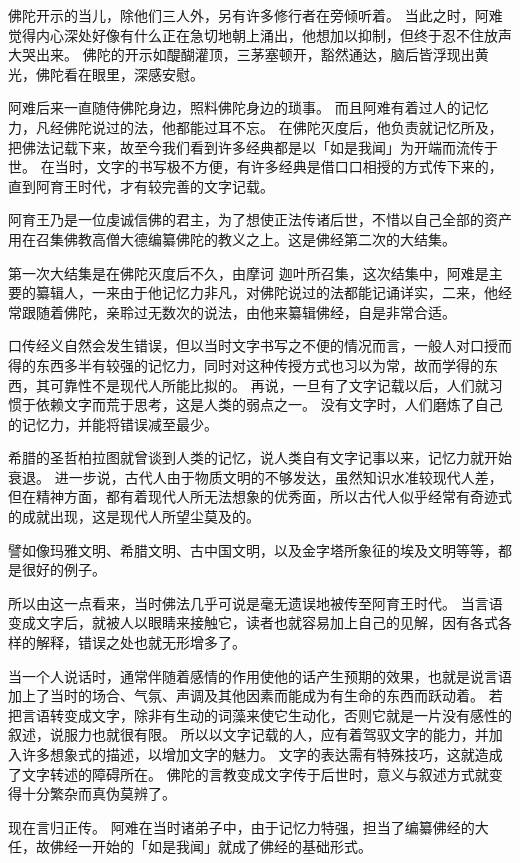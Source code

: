 \documentclass[twoside,openany]{book}
\begin{document}
佛陀开示的当儿，除他们三人外，另有许多修行者在旁倾听着。
当此之时，阿难觉得内心深处好像有什么正在急切地朝上涌出，他想加以抑制，但终于忍不住放声大哭出来。
佛陀的开示如醍醐灌顶，三茅塞顿开，豁然通达，脑后皆浮现出黄光，佛陀看在眼里，深感安慰。

阿难后来一直随侍佛陀身边，照料佛陀身边的琐事。
而且阿难有着过人的记忆力，凡经佛陀说过的法，他都能过耳不忘。
在佛陀灭度后，他负责就记忆所及，把佛法记载下来，故至今我们看到许多经典都是以「如是我闻」为开端而流传于世。
在当时，文字的书写极不方便，有许多经典是借口口相授的方式传下来的，直到阿育王时代，才有较完善的文字记载。

阿育王乃是一位虔诚信佛的君主，为了想使正法传诸后世，不惜以自己全部的资产用在召集佛教高僧大德编纂佛陀的教义之上。这是佛经第二次的大结集。

第一次大结集是在佛陀灭度后不久，由摩诃 \textperiodcentered 迦叶所召集，这次结集中，阿难是主要的纂辑人，一来由于他记忆力非凡，对佛陀说过的法都能记诵详实，二来，他经常跟随着佛陀，亲聆过无数次的说法，由他来纂辑佛经，自是非常合适。

口传经义自然会发生错误，但以当时文字书写之不便的情况而言，一般人对口授而得的东西多半有较强的记忆力，同时对这种传授方式也习以为常，故而学得的东西，其可靠性不是现代人所能比拟的。
再说，一旦有了文字记载以后，人们就习惯于依赖文字而荒于思考，这是人类的弱点之一。
没有文字时，人们磨炼了自己的记忆力，并能将错误减至最少。

希腊的圣哲柏拉图就曾谈到人类的记忆，说人类自有文字记事以来，记忆力就开始衰退。
进一步说，古代人由于物质文明的不够发达，虽然知识水准较现代人差，但在精神方面，都有着现代人所无法想象的优秀面，所以古代人似乎经常有奇迹式的成就出现，这是现代人所望尘莫及的。

譬如像玛雅文明、希腊文明、古中国文明，以及金字塔所象征的埃及文明等等，都是很好的例子。

所以由这一点看来，当时佛法几乎可说是毫无遗误地被传至阿育王时代。
当言语变成文字后，就被人以眼睛来接触它，读者也就容易加上自己的见解，因有各式各样的解释，错误之处也就无形增多了。

当一个人说话时，通常伴随着感情的作用使他的话产生预期的效果，也就是说言语加上了当时的场合、气氛、声调及其他因素而能成为有生命的东西而跃动着。
若把言语转变成文字，除非有生动的词藻来使它生动化，否则它就是一片没有感性的叙述，说服力也就很有限。
所以以文字记载的人，应有着驾驭文字的能力，并加入许多想象式的描述，以增加文字的魅力。
文字的表达需有特殊技巧，这就造成了文字转述的障碍所在。
佛陀的言教变成文字传于后世时，意义与叙述方式就变得十分繁杂而真伪莫辨了。

现在言归正传。
阿难在当时诸弟子中，由于记忆力特强，担当了编纂佛经的大任，故佛经一开始的「如是我闻」就成了佛经的基础形式。
\end{document}
